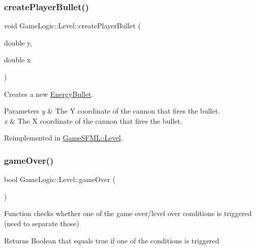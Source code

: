 \subsubsection{\texorpdfstring{create\+Player\+Bullet()}{createPlayerBullet()}}
{\footnotesize\ttfamily void Game\+Logic\+::\+Level\+::create\+Player\+Bullet (\begin{DoxyParamCaption}\item[{double}]{y,  }\item[{double}]{x }\end{DoxyParamCaption})\hspace{0.3cm}{\ttfamily [virtual]}}

Creates a new \hyperlink{classGameLogic_1_1EnergyBullet}{Energy\+Bullet}. 
\begin{DoxyParams}{Parameters}
{\em y} & The Y coordinate of the cannon that fires the bullet. \\
\hline
{\em x} & The X coordinate of the cannon that fires the bullet. \\
\hline
\end{DoxyParams}


Reimplemented in \hyperlink{classGameSFML_1_1Level_adafff50ab250a1d85f1b1d48c085bac1}{Game\+S\+F\+M\+L\+::\+Level}.

\mbox{\label{classGameLogic_1_1Level_ab4496926ad24689d101de4a2e3702149}} 
\subsubsection{\texorpdfstring{game\+Over()}{gameOver()}}
{\footnotesize\ttfamily bool Game\+Logic\+::\+Level\+::game\+Over (\begin{DoxyParamCaption}{ }\end{DoxyParamCaption})}

Function checks whether one of the game over/level over conditions is triggered (need to separate those) \begin{DoxyReturn}{Returns}
Boolean that equals true if one of the conditions is triggered 
\end{DoxyReturn}
\mbox{\label{classGameLogic_1_1Level_a5063897104bbf7ff1f2d173cc37a0f57}} 

